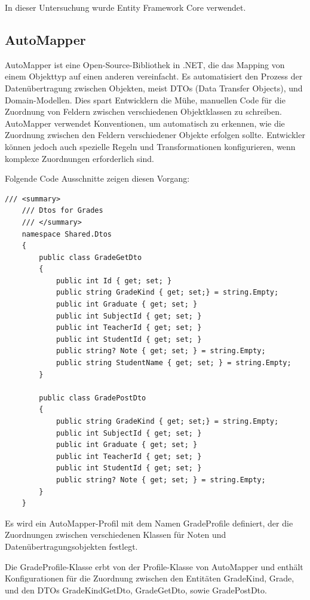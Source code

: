 In dieser Untersuchung wurde Entity Framework Core verwendet.
    \newpage
\subsection{AutoMapper}
AutoMapper ist eine Open-Source-Bibliothek in .NET, die das Mapping von einem Objekttyp auf einen anderen vereinfacht. Es automatisiert den Prozess der Datenübertragung zwischen Objekten, meist DTOs (Data Transfer Objects), und Domain-Modellen. Dies spart Entwicklern die Mühe, manuellen Code für die Zuordnung von Feldern zwischen verschiedenen Objektklassen zu schreiben.
AutoMapper verwendet Konventionen, um automatisch zu erkennen, wie die Zuordnung zwischen den Feldern verschiedener Objekte erfolgen sollte. Entwickler können jedoch auch spezielle Regeln und Transformationen konfigurieren, wenn komplexe Zuordnungen erforderlich sind.


Folgende Code Ausschnitte zeigen diesen Vorgang:

\begin{lstlisting}[language={[Sharp]C}, caption=DTO, label=lst:imp:dto]
    /// <summary>
    /// Dtos for Grades
    /// </summary>
    namespace Shared.Dtos
    {
        public class GradeGetDto
        {
            public int Id { get; set; } 
            public string GradeKind { get; set;} = string.Empty;
            public int Graduate { get; set; }
            public int SubjectId { get; set; }
            public int TeacherId { get; set; } 
            public int StudentId { get; set; } 
            public string? Note { get; set; } = string.Empty;
            public string StudentName { get; set; } = string.Empty;
        }

        public class GradePostDto
        {
            public string GradeKind { get; set;} = string.Empty;
            public int SubjectId { get; set; }
            public int Graduate { get; set; }
            public int TeacherId { get; set; } 
            public int StudentId { get; set; } 
            public string? Note { get; set; } = string.Empty;
        }
    }
\end{lstlisting}

\newpage
Es wird ein AutoMapper-Profil mit dem Namen GradeProfile definiert, der die Zuordnungen zwischen verschiedenen Klassen für Noten und Datenübertragungsobjekten festlegt.

Die GradeProfile-Klasse erbt von der Profile-Klasse von AutoMapper und enthält Konfigurationen für die Zuordnung zwischen den Entitäten GradeKind, Grade, und den DTOs GradeKindGetDto, GradeGetDto, sowie GradePostDto.

